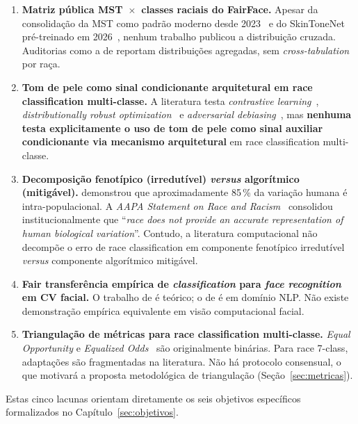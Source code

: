 \begin{enumerate}[label=\textbf{G\arabic*}.]
\item \textbf{Matriz pública MST~$\times$~classes raciais do FairFace.} Apesar da consolidação da MST como padrão moderno desde 2023~\cite{schumann2023consensus} e do SkinToneNet pré-treinado em 2026~\cite{matias2026large}, nenhum trabalho publicou a distribuição cruzada. Auditorias como a de  reportam distribuições agregadas, sem \emph{cross-tabulation} por raça.

\item \textbf{Tom de pele como sinal condicionante arquitetural em race classification multi-classe.} A literatura testa \emph{contrastive learning}~\cite{park2022fair}, \emph{distributionally robust optimization}~\cite{sagawa2020distribution} e \emph{adversarial debiasing}~\cite{zhang2018mitigating}, mas \textbf{nenhuma testa explicitamente o uso de tom de pele como sinal auxiliar condicionante via mecanismo arquitetural} em race classification multi-classe.

\item \textbf{Decomposição fenotípico (irredutível) \emph{versus} algorítmico (mitigável).}  demonstrou que aproximadamente 85\,\% da variação humana é intra-populacional. A \emph{AAPA Statement on Race and Racism}~\cite{fuentes2019aapa} consolidou institucionalmente que ``\emph{race does not provide an accurate representation of human biological variation}''. Contudo, a literatura computacional não decompõe o erro de race classification em componente fenotípico irredutível \emph{versus} componente algorítmico mitigável.

\item \textbf{Fair transferência empírica de \emph{classification} para \emph{face recognition} em CV facial.} O trabalho de  é teórico; o de  é em domínio NLP. Não existe demonstração empírica equivalente em visão computacional facial.

\item \textbf{Triangulação de métricas para race classification multi-classe.} \emph{Equal Opportunity} e \emph{Equalized Odds}~\cite{hardt2016equality} são originalmente binárias. Para race 7-class, adaptações são fragmentadas na literatura. Não há protocolo consensual, o que motivará a proposta metodológica de triangulação (Seção~\ref{sec:metricas}).
\end{enumerate}

Estas cinco lacunas orientam diretamente os seis objetivos específicos formalizados no Capítulo~\ref{sec:objetivos}.
